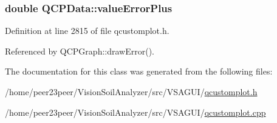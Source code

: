 \hypertarget{class_q_c_p_data_ad26912552d03485ea20d91dcad16aa8f}{}
\subsubsection[{value\+Error\+Plus}]{\setlength{\rightskip}{0pt plus 5cm}double Q\+C\+P\+Data\+::value\+Error\+Plus}\label{class_q_c_p_data_ad26912552d03485ea20d91dcad16aa8f}


Definition at line 2815 of file qcustomplot.\+h.



Referenced by Q\+C\+P\+Graph\+::draw\+Error().



The documentation for this class was generated from the following files\+:\begin{DoxyCompactItemize}
\item 
/home/peer23peer/\+Vision\+Soil\+Analyzer/src/\+V\+S\+A\+G\+U\+I/\hyperlink{qcustomplot_8h}{qcustomplot.\+h}\item 
/home/peer23peer/\+Vision\+Soil\+Analyzer/src/\+V\+S\+A\+G\+U\+I/\hyperlink{qcustomplot_8cpp}{qcustomplot.\+cpp}\end{DoxyCompactItemize}
